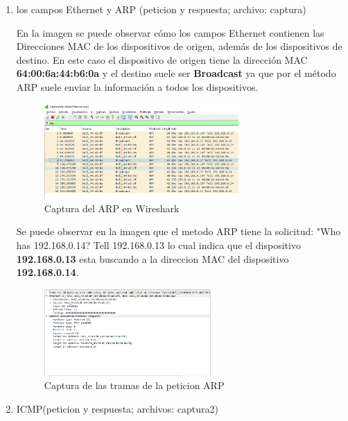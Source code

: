         \begin{enumerate}
            \item los campos Ethernet y ARP (peticion y respuesta; archivo: captura)
            
            En la imagen se puede observar cómo los campos Ethernet contienen las Direcciones MAC de los dispositivos de origen, además de los dispositivos de destino. En este caso el dispositivo de origen tiene la dirección MAC \textbf{64:00:6a:44:b6:0a} y el destino suele ser \textbf{Broadcast} ya que por el método ARP suele enviar la información a todos los dispositivos.
            \begin{figure}[H]
                \centering
                \includegraphics[width=0.7\textwidth]{img/ARP.PNG}
                \caption{Captura del ARP en Wireshark}
                \label{fig:ARP}
            \end{figure}

            Se puede observar en la imagen que el metodo ARP tiene la solicitud: "Who has 192.168.0.14? Tell 192.168.0.13 lo cual indica que el dispositivo \textbf{192.168.0.13} esta buscando a la direccion MAC del dispositivo \textbf{192.168.0.14}.
            \begin{figure}[H]
                \centering
                \includegraphics[width=0.6\textwidth]{img/PeticionARP.PNG}
                \caption{Captura de las tramas de la peticion ARP}
                \label{fig:peticionARP}
            \end{figure}
            \item ICMP(peticion y respuesta; archivos: captura2)
            

\end{enumerate}
